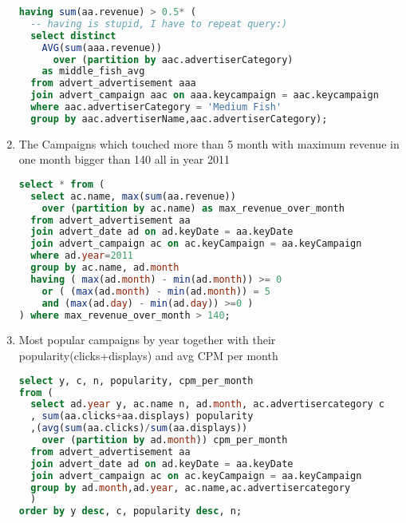 \begin{enumerate}
\begin{lstlisting}[language=sql]
having sum(aa.revenue) > 0.5* (
  -- having is stupid, I have to repeat query:)
  select distinct
    AVG(sum(aaa.revenue)) 
      over (partition by aac.advertiserCategory) 
    as middle_fish_avg
  from advert_advertisement aaa 
  join advert_campaign aac on aaa.keycampaign = aac.keycampaign
  where aac.advertiserCategory = 'Medium Fish'   
  group by aac.advertiserName,aac.advertiserCategory);
  \end{lstlisting}
\item    The Campaigns which touched more than 5 month with maximum revenue in one month bigger than 140 all in year 2011 
  \begin{lstlisting}[language=sql] 
select * from (
  select ac.name, max(sum(aa.revenue)) 
    over (partition by ac.name) as max_revenue_over_month
  from advert_advertisement aa
  join advert_date ad on ad.keyDate = aa.keyDate
  join advert_campaign ac on ac.keyCampaign = aa.keyCampaign
  where ad.year=2011
  group by ac.name, ad.month
  having ( max(ad.month) - min(ad.month)) >= 0 
    or ( (max(ad.month) - min(ad.month)) = 5 
    and (max(ad.day) - min(ad.day)) >=0 )
) where max_revenue_over_month > 140;
  \end{lstlisting}
\item Most popular campaigns by year together with their popularity(clicks+displays) and  avg CPM per month
  \begin{lstlisting}[language=sql] 
select y, c, n, popularity, cpm_per_month
from (
  select ad.year y, ac.name n, ad.month, ac.advertisercategory c
  , sum(aa.clicks+aa.displays) popularity
  ,(avg(sum(aa.clicks)/sum(aa.displays)) 
    over (partition by ad.month)) cpm_per_month 
  from advert_advertisement aa
  join advert_date ad on ad.keyDate = aa.keyDate
  join advert_campaign ac on ac.keyCampaign = aa.keyCampaign
  group by ad.month,ad.year, ac.name,ac.advertisercategory
  )
order by y desc, c, popularity desc, n;
  \end{lstlisting}
\end{enumerate}



